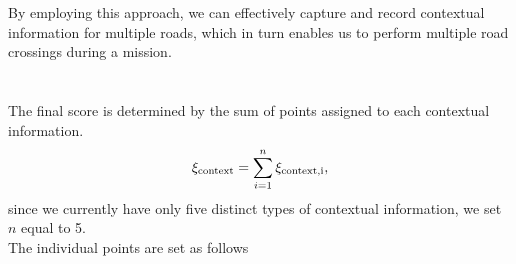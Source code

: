             By employing this approach, we can effectively capture and record contextual information for multiple roads, which in turn enables us to perform multiple road crossings during a mission.\\\\
        \\
            The final score is determined by the sum of points assigned to each contextual information.
            \begin{equation}
                \xi_{\rm{context}} = \sum_{i=1}^{n} \xi_{\rm{context},i},
            \end{equation}
            since we currently have only five distinct types of contextual information, we set $n$ equal to 5.\\
            The individual points are set as follows

